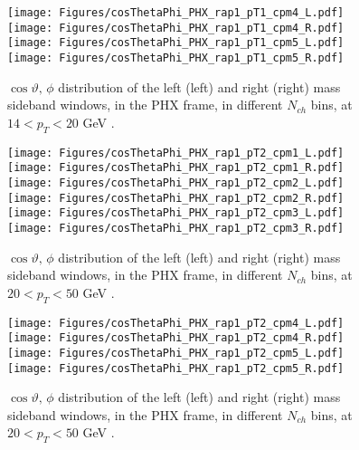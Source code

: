 \documentclass[12pt]{article}
\begin{document}
\begin{figure}[htbp]
\centering
\texttt{[image: Figures/cosThetaPhi\_PHX\_rap1\_pT1\_cpm4\_L.pdf]}
\texttt{[image: Figures/cosThetaPhi\_PHX\_rap1\_pT1\_cpm4\_R.pdf]}
\texttt{[image: Figures/cosThetaPhi\_PHX\_rap1\_pT1\_cpm5\_L.pdf]}
\texttt{[image: Figures/cosThetaPhi\_PHX\_rap1\_pT1\_cpm5\_R.pdf]}
\caption{$\cos\vartheta,\,\phi$ distribution of the left (left) and
  right (right) mass sideband windows, in the PHX frame, in different
  $N_{ch}$ bins, at $14 < p_{T} < 20$ GeV .}
\end{figure}
\clearpage


\begin{figure}[htbp]
\centering
\texttt{[image: Figures/cosThetaPhi\_PHX\_rap1\_pT2\_cpm1\_L.pdf]}
\texttt{[image: Figures/cosThetaPhi\_PHX\_rap1\_pT2\_cpm1\_R.pdf]}
\texttt{[image: Figures/cosThetaPhi\_PHX\_rap1\_pT2\_cpm2\_L.pdf]}
\texttt{[image: Figures/cosThetaPhi\_PHX\_rap1\_pT2\_cpm2\_R.pdf]}
\texttt{[image: Figures/cosThetaPhi\_PHX\_rap1\_pT2\_cpm3\_L.pdf]}
\texttt{[image: Figures/cosThetaPhi\_PHX\_rap1\_pT2\_cpm3\_R.pdf]}
\caption{$\cos\vartheta,\,\phi$ distribution of the left (left) and
  right (right) mass sideband windows, in the PHX frame, in different
  $N_{ch}$ bins, at $20 < p_{T} < 50$ GeV .}
\end{figure}
\clearpage

\begin{figure}[htbp]
\centering
\texttt{[image: Figures/cosThetaPhi\_PHX\_rap1\_pT2\_cpm4\_L.pdf]}
\texttt{[image: Figures/cosThetaPhi\_PHX\_rap1\_pT2\_cpm4\_R.pdf]}
\texttt{[image: Figures/cosThetaPhi\_PHX\_rap1\_pT2\_cpm5\_L.pdf]}
\texttt{[image: Figures/cosThetaPhi\_PHX\_rap1\_pT2\_cpm5\_R.pdf]}
\caption{$\cos\vartheta,\,\phi$ distribution of the left (left) and
  right (right) mass sideband windows, in the PHX frame, in different
  $N_{ch}$ bins, at $20 < p_{T} < 50$ GeV .}
\end{figure}
\clearpage
\end{document}
